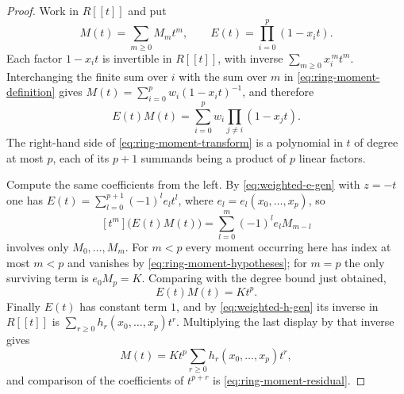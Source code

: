\documentclass[11pt,a4paper,oneside,openany]{book}
\theoremstyle{definition}
\theoremstyle{remark}
\begin{document}
\begin{proof}
Work in $R[[t]]$ and put
\[
 M(t)=\sum_{m\ge0}M_mt^m,
 \qquad
 E(t)=\prod_{i=0}^{p}(1-x_it).
\]
Each factor $1-x_it$ is invertible in $R[[t]]$, with inverse
$\sum_{m\ge0}x_i^{\,m}t^m$.  Interchanging the finite sum over $i$ with the sum
over $m$ in \eqref{eq:ring-moment-definition} gives
$M(t)=\sum_{i=0}^{p}w_i(1-x_it)^{-1}$, and therefore
\begin{equation}\label{eq:ring-moment-transform}
 E(t)M(t)=\sum_{i=0}^{p}w_i\prod_{j\ne i}(1-x_jt).
\end{equation}
The right-hand side of \eqref{eq:ring-moment-transform} is a polynomial in $t$ of
degree at most $p$, each of its $p+1$ summands being a product of $p$ linear
factors.

Compute the same coefficients from the left.  By \eqref{eq:weighted-e-gen} with
$z=-t$ one has $E(t)=\sum_{l=0}^{p+1}(-1)^le_lt^l$, where
$e_l=e_l(x_0,\ldots,x_p)$, so
\[
 [t^m]\bigl(E(t)M(t)\bigr)=\sum_{l=0}^{m}(-1)^le_lM_{m-l}
\]
involves only $M_0,\ldots,M_m$.  For $m<p$ every moment occurring here has index
at most $m<p$ and vanishes by \eqref{eq:ring-moment-hypotheses}; for $m=p$ the
only surviving term is $e_0M_p=K$.  Comparing with the degree bound just
obtained,
\[
 E(t)M(t)=Kt^p.
\]
Finally $E(t)$ has constant term $1$, and by \eqref{eq:weighted-h-gen} its inverse
in $R[[t]]$ is $\sum_{r\ge0}h_r(x_0,\ldots,x_p)t^r$.  Multiplying the last display
by that inverse gives
\[
 M(t)=Kt^p\sum_{r\ge0}h_r(x_0,\ldots,x_p)t^r,
\]
and comparison of the coefficients of $t^{p+r}$ is
\eqref{eq:ring-moment-residual}.
\end{proof}
\end{document}
